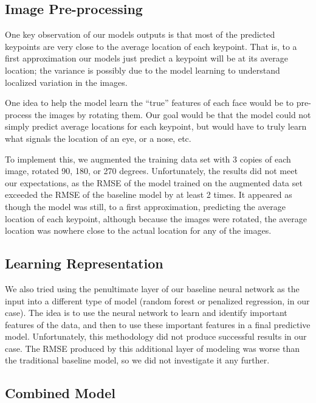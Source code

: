 \documentclass[journal]{IEEEtran}
\begin{document}
\subsection{Image Pre-processing}

One key observation of our models outputs is that most of the predicted keypoints are very close to the average location of each keypoint. That is, to a first approximation our models just predict a keypoint will be at its average location; the variance is possibly due to the model learning to understand localized variation in the images.

One idea to help the model learn the ``true'' features of each face would be to pre-process the images by rotating them. Our goal would be that the model could not simply predict average locations for each keypoint, but would have to truly learn what signals the location of an eye, or a nose, etc. 

To implement this, we augmented the training data set with 3 copies of each image, rotated 90, 180, or 270 degrees. Unfortunately, the results did not meet our expectations, as the RMSE of the model trained on the augmented data set exceeded the RMSE of the baseline model by at least 2 times. It appeared as though the model was still, to a first approximation, predicting the average location of each keypoint, although because the images were rotated, the average location was nowhere close to the actual location for any of the images.

\subsection{Learning Representation}

We also tried using the penultimate layer of our baseline neural network as the input into a different type of model (random forest or penalized regression, in our case). The idea is to use the neural network to learn and identify important features of the data, and then to use these important features in a final predictive model. Unfortunately, this methodology did not produce successful results in our case. The RMSE produced by this additional layer of modeling was worse than the traditional baseline model, so we did not investigate it any further.

\subsection{Combined Model}
\end{document}
